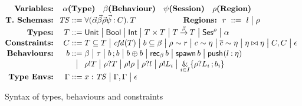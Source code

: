 \begin{figure}

\[
  \begin{array}{@{}r@{~~}r@{\;}c@{\;}l}
    \textbf{Variables:} &
\multicolumn{3}{l}{%
  \alpha \textbf{(Type)}
  \quad
  \beta \textbf{(Behaviour)}
  \quad
  \psi \textbf{(Session)}
  \quad
  \rho \textbf{(Region)}
}
\\[.3ex]
\textbf{T.\ Schemas:} &  \mathit{TS}  & ::= &  \typeschema{\vec\alpha\vec\beta\vec\rho
                                    \vec\psi
                                    }{C}{T}
\qquad \qquad \qquad \textbf{Regions:} ~~ r ~ ::= ~  l \bnf \rho
\\%
  \textbf{Types:}            &  T  & ::= & \tunit
                                   \bnf  \tbool
                                   \bnf  \tint
                                   \bnf  T\times T
                                   \bnf  \tfun{T}{T}{\beta}
                                   \bnf  \tses{\rho}
                                   \bnf  \alpha
\\[.3ex]
\textbf{Constraints:} &  C  & ::= &       \su{T}{T}
                                  \bnf \cfd T
                                  \bnf \su{b}{\beta}
                                  \bnf \seql{\rho}{r}
                                  \bnf \seql{c}{\eta}
                                  \bnf \seql{\co c}{\eta}
                                  \bnf \eta \bowtie \eta  
                                  \bnf C,C \bnf \epsilon
\\[.3ex]
\textbf{Behaviours:}         &  b  & ::= &  \beta
                                       \bnf \tau
                                      \bnf \bseq{b}{b}
                                       \bnf \bichoice{b}{b}
                                       \bnf \orec{b}{\beta}
                                       \bnf \espawn{b}
                                       \bnf \pusho{l}{\eta}{}
\\[.3ex]
                        &&       \bnf &  \popo{\rho}{\outp T}
                                       \bnf \popo{\rho}{\inp T}
                                       \bnf \popo{\rho}{\outp \rho}
                                       \bnf \popo{\rho}{\inp l}
                                       \bnf \popo{\rho}{\outp L_i}
                                       \bnf \bechoice{}{\rho}{L_i}{b_i}
\\[.3ex]
\textbf{Type Envs:} &  \Gamma  & ::=  & x: \mathit{TS} \bnf \Gamma,\Gamma\bnf\epsilon
\end{array}
\]
\caption{Syntax of types, behaviours and constraints}
\label{syntaxTypes}
\end{figure}

